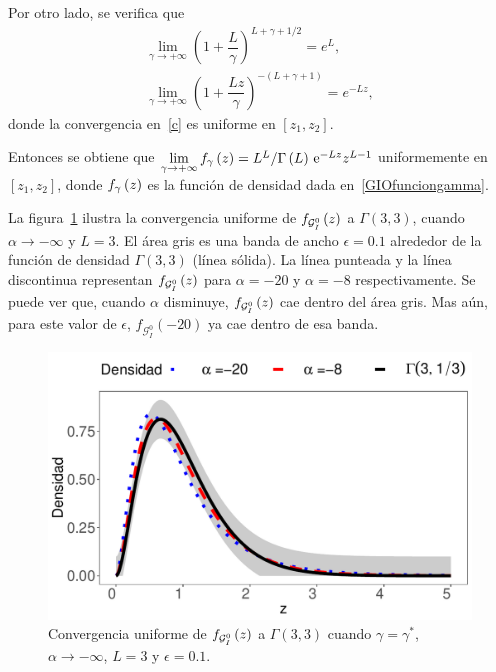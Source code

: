 \begin{dem}
	Por otro lado, se verifica que
	\begin{align}
	\label{b}
	\lim_{\gamma\to+\infty} \left(1+\dfrac{L}{\gamma}\right)^{L+\gamma +1/2}=e^L,\\
	\label{c}
	\lim_{\gamma\to+\infty} \left(1+\dfrac{L z}{\gamma}\right)^{-(L+\gamma +1)}=e^{-L z} ,
	\end{align}
	donde la convergencia en~\eqref{c} es uniforme en $[z_{1},z_{2}]$.
	
	Entonces se obtiene que $\lim\limits_{\gamma\to+\infty}f_{\gamma}\left( z \right) = L^{L}/\Gamma\left( L \right)\,\mathrm{e}^{-Lz}z^{L-1}$ uniformemente en $[z_{1},z_{2}]$, donde $f_{\gamma}\left( z \right)$ es la función de densidad dada en~\eqref{GIOfunciongamma}.
\end{dem}

La figura~\ref{ConvInfinito} ilustra la convergencia uniforme de $f_{\mathcal{G}_I^0}\left( z \right)$ a $\Gamma(3,3)$, cuando $\alpha \to -\infty$ y $L=3$. 
El área gris es una banda de ancho $\epsilon=0.1$ alrededor de la función de densidad $\Gamma(3,3)$ (línea sólida). 
La línea punteada y la línea discontinua representan $f_{\mathcal{G}_I^0}\left( z \right)$ para $\alpha=-20$ y $\alpha=-8$ respectivamente. 
Se puede ver que, cuando $\alpha$ disminuye, $f_{\mathcal{G}_I^0}\left( z \right)$ cae dentro del área gris. 
Mas aún, para este valor de $\epsilon$, $f_{\mathcal{G}_I^0}(-20)$ ya cae dentro de esa banda.


\begin{figure}[hbt]
\begin{center}
	\includegraphics[scale=0.8]{../../Figures/Tesis/Capitulo4/ConvUniformeMenosInfinito2.pdf}
	\caption{\label{ConvInfinito}\small{Convergencia uniforme de $f_{\mathcal{G}_I^0}\left( z \right)$ a $\Gamma(3,3)$ cuando $\gamma=\gamma^*$, $\alpha \to -\infty$, $L=3$ y $\epsilon=0.1$.}}
\end{center}
\end{figure} 


